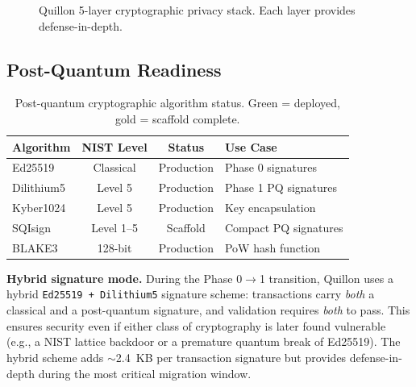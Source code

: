 \documentclass[11pt,a4paper]{article}
\begin{document}
\begin{figure}[H]
\centering
{}
\caption{Quillon 5-layer cryptographic privacy stack. Each layer provides defense-in-depth.}
\end{figure}

\subsection{Post-Quantum Readiness}

\begin{table}[H]
\centering
\begin{tabular}{l c c l}
\toprule
\textbf{Algorithm} & \textbf{NIST Level} & \textbf{Status} & \textbf{Use Case} \\
\midrule
Ed25519 & Classical & \cellcolor{qgreen!20}Production & Phase 0 signatures \\
Dilithium5 & Level 5 & \cellcolor{qgreen!20}Production & Phase 1 PQ signatures \\
Kyber1024 & Level 5 & \cellcolor{qgreen!20}Production & Key encapsulation \\
SQIsign & Level 1--5 & \cellcolor{qgold!20}Scaffold & Compact PQ signatures \\
BLAKE3 & 128-bit & \cellcolor{qgreen!20}Production & PoW hash function \\
\bottomrule
\end{tabular}
\caption{Post-quantum cryptographic algorithm status. Green = deployed, gold = scaffold complete.}
\end{table}

\noindent\textbf{Hybrid signature mode.} During the Phase 0$\rightarrow$1 transition, Quillon uses a hybrid \texttt{Ed25519\,+\,Dilithium5} signature scheme: transactions carry \emph{both} a classical and a post-quantum signature, and validation requires \emph{both} to pass. This ensures security even if either class of cryptography is later found vulnerable (e.g., a NIST lattice backdoor or a premature quantum break of Ed25519). The hybrid scheme adds $\sim$2.4~KB per transaction signature but provides defense-in-depth during the most critical migration window.
\end{document}
